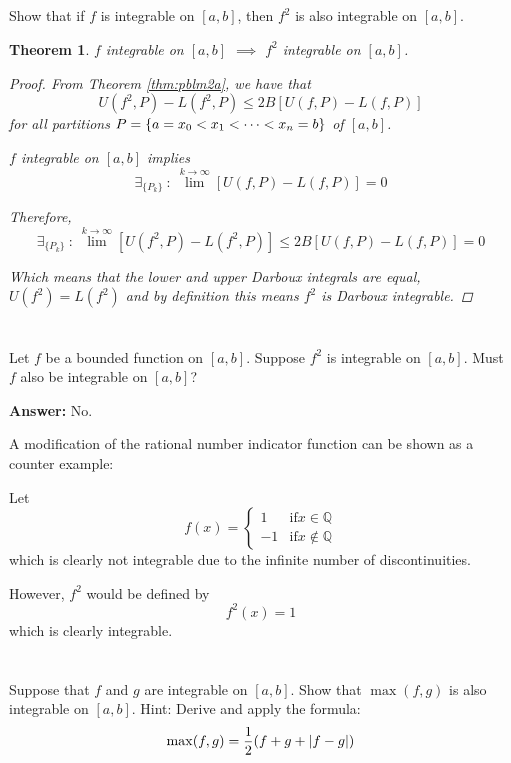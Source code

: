 \documentclass[]{article}
\newcommand{\Q}{\mathbb{Q}}
\newcommand{\st}{\ : \ }
\newtheorem{theorem}{Theorem}
\begin{document}
\newpage
\subsection{}
Show that if $f$ is integrable on $[a,b]$, then $f^2$ is also integrable on $[a,b]$.

\begin{theorem}
    $f$ integrable on $[a,b]$ $\implies$ $f^2$ integrable on $[a,b]$.
    \begin{proof}
        From Theorem \ref{thm:pblm2a}, we have that \[
            U(f^2,P) - L(f^2,P) \leq 2 B [U(f,P) - L(f,P)]
        \] for all partitions $P=\qty{a=x_0<x_1<\dots<x_n=b}$ of $[a,b]$.

        $f$ integrable on $[a,b]$ implies\[
            \exists_{\{P_k\}} \st \lim^{k\to\infty} [U(f,P) - L(f,P)] = 0
        \]

        Therefore,\[
            \exists_{\{P_k\}} \st \lim^{k\to\infty} [U(f^2,P) - L(f^2,P)] \leq 2B [U(f,P) - L(f,P)] = 0
        \]

        Which means that the lower and upper Darboux integrals are equal, 
        $U(f^2) = L(f^2)$ and by definition this means $f^2$ is Darboux integrable.
    \end{proof}
\end{theorem}

\newpage
\section{}
Let $f$ be a bounded function on $[a,b]$.
Suppose $f^2$ is integrable on $[a,b]$.
Must $f$ also be integrable on $[a,b]$?

\textbf{Answer:} 
No.

A modification of the rational number indicator function can be shown as a counter example:

Let\[
    f(x) = \begin{cases}
        1 & \text{if} x \in \Q\\
        -1 & \text{if} x \notin \Q
    \end{cases}
\] which is clearly not integrable due to the infinite number of discontinuities.

However, $f^2$ would be defined by \[
    f^2(x) = 1
\] which is clearly integrable.

\newpage
\section{}
Suppose that $f$ and $g$ are integrable on $[a,b]$. 
Show that $\max(f,g)$ is also integrable on $[a,b]$.
Hint: Derive and apply the formula:\[
    \max(f,g) = \frac{1}{2} (f+g+\abs{f-g})
\]
\end{document}

